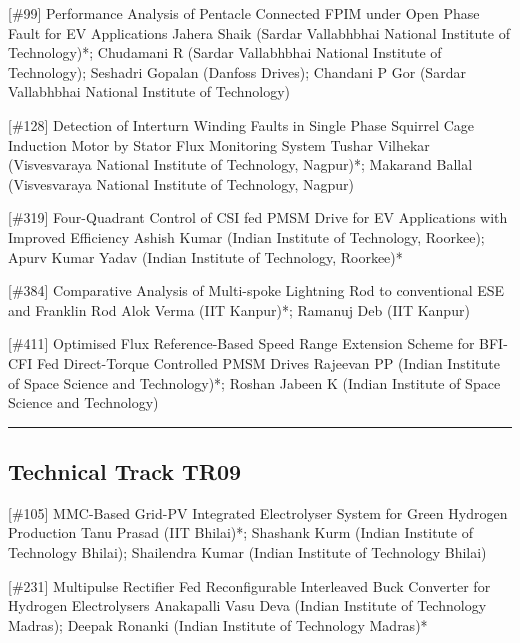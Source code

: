 {} \begin{abstract_online} {[\#99] Performance Analysis of Pentacle Connected FPIM under Open Phase Fault for EV Applications} {} {Jahera Shaik (Sardar Vallabhbhai National Institute of Technology)*; Chudamani R (Sardar Vallabhbhai National Institute of Technology); Seshadri  Gopalan (Danfoss Drives); Chandani  P Gor (Sardar Vallabhbhai National Institute of Technology)} {}  \end{abstract_online} 
{} \begin{abstract_online} {[\#128] Detection of Interturn Winding Faults in Single Phase Squirrel Cage Induction Motor by Stator Flux Monitoring System} {} {Tushar Vilhekar (Visvesvaraya National Institute of Technology, Nagpur)*; Makarand Ballal (Visvesvaraya National Institute of Technology, Nagpur)} {}  \end{abstract_online} 
{} \begin{abstract_online} {[\#319] Four-Quadrant Control of CSI fed PMSM Drive for  EV Applications with Improved Efficiency} {} {Ashish Kumar (Indian Institute of Technology, Roorkee); Apurv Kumar Yadav (Indian Institute of Technology, Roorkee)*} {}  \end{abstract_online} 
{} \begin{abstract_online} {[\#384] Comparative Analysis of Multi-spoke Lightning Rod to conventional ESE and Franklin Rod} {} {Alok Verma (IIT Kanpur)*; Ramanuj Deb (IIT Kanpur)} {}  \end{abstract_online} 
{} \begin{abstract_online} {[\#411] Optimised Flux Reference-Based Speed Range Extension Scheme for BFI-CFI Fed Direct-Torque Controlled PMSM Drives} {} {Rajeevan PP (Indian Institute of Space Science and Technology)*; Roshan Jabeen K (Indian Institute of Space Science and Technology)} {}  \end{abstract_online} 
\hrule  \subsection{Technical Track TR09}\nopagebreak {} \begin{abstract_online} {[\#105] MMC-Based Grid-PV Integrated Electrolyser System for Green Hydrogen Production } {} {Tanu Prasad (IIT Bhilai)*; Shashank Kurm (Indian Institute of Technology Bhilai); Shailendra  Kumar (Indian Institute of Technology Bhilai)} {}  \end{abstract_online} 
{} \begin{abstract_online} {[\#231] Multipulse Rectifier Fed Reconfigurable Interleaved  Buck Converter for Hydrogen Electrolysers} {} {Anakapalli Vasu Deva (Indian Institute of Technology Madras); Deepak  Ronanki (Indian Institute of Technology Madras)*} {}  \end{abstract_online} 
